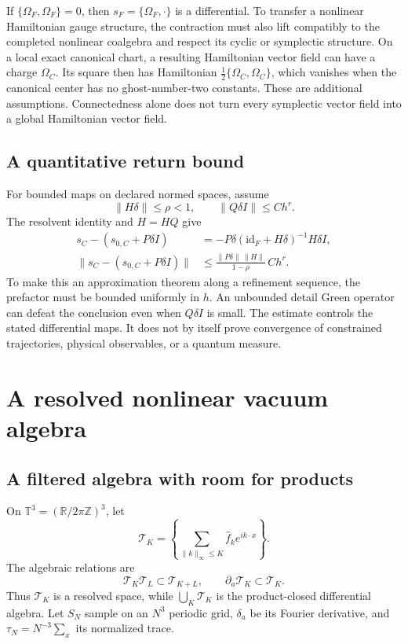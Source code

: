 If $\{\Omega_F,\Omega_F\}=0$, then
$s_F=\{\Omega_F,\cdot\}$ is a differential. To transfer a nonlinear Hamiltonian gauge structure, the contraction must also lift compatibly to the completed nonlinear coalgebra and respect its cyclic or symplectic structure. On a local exact canonical chart, a resulting Hamiltonian vector field can have a charge $\Omega_C$. Its square then has Hamiltonian $\tfrac12\{\Omega_C,\Omega_C\}$, which vanishes when the canonical center has no ghost-number-two constants. These are additional assumptions. Connectedness alone does not turn every symplectic vector field into a global Hamiltonian vector field.

\subsection{A quantitative return bound}
For bounded maps on declared normed spaces, assume
\begin{equation}
 \|H\delta\|\le\rho<1,\qquad
 \|Q\delta I\|\le C h^r.
\end{equation}
The resolvent identity and $H=HQ$ give
\begin{align}
 s_C-(s_{0,C}+P\delta I)
 &=-P\delta(\mathrm{id}_F+H\delta)^{-1}H\delta I,\\
 \|s_C-(s_{0,C}+P\delta I)\|
 &\le\frac{\|P\delta\|\,\|H\|}{1-\rho}\,C h^r.
 \label{c:constraints:return-bound}
\end{align}
To make this an approximation theorem along a refinement sequence, the prefactor must be bounded uniformly in $h$. An unbounded detail Green operator can defeat the conclusion even when $Q\delta I$ is small. The estimate controls the stated differential maps. It does not by itself prove convergence of constrained trajectories, physical observables, or a quantum measure.

\section{A resolved nonlinear vacuum algebra}
\label{c:constraints:resolved}

\subsection{A filtered algebra with room for products}
On $\mathbb T^3=(\mathbb R/2\pi\mathbb Z)^3$, let
\begin{equation}
 \mathcal T_K=\left\{\sum_{\|k\|_\infty\le K}
              \widehat f_k e^{ik\cdot x}\right\}.
\end{equation}
The algebraic relations are
\begin{equation}
 \mathcal T_K\mathcal T_L\subset\mathcal T_{K+L},\qquad
 \partial_a\mathcal T_K\subset\mathcal T_K.
\end{equation}
Thus $\mathcal T_K$ is a resolved space, while
$\bigcup_K\mathcal T_K$ is the product-closed differential algebra.
Let $S_N$ sample on an $N^3$ periodic grid, $\delta_a$ be its Fourier derivative, and
$\tau_N=N^{-3}\sum_x$ its normalized trace.

